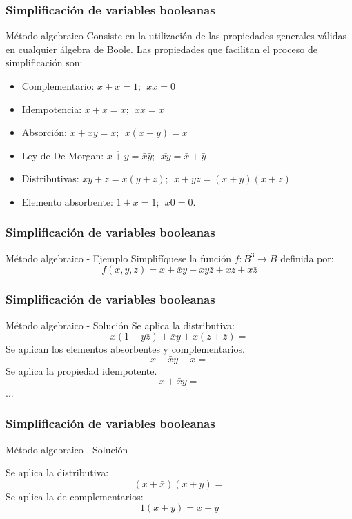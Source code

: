 \documentclass{beamer}
\begin{document}
\begin{frame}
\frametitle{Simplificaci\'on de variables booleanas}
\begin{block}{M\'etodo algebraico}
Consiste en la utilizaci\'on de las propiedades generales v\'alidas en cualquier \'algebra de Boole. Las propiedades que facilitan el proceso de simplificaci\'on son:
\begin{itemize}
\item Complementario: $x+\bar x = 1;\ \  x\bar x = 0$
\item Idempotencia: $x+ x = x;\ \  x x = x$
\item Absorci\'on: $x+ xy = x;\ \  x( x+y) = x$
\item Ley de De Morgan: $\overline{x+y}  = \bar x\bar y ;\ \  \overline{xy} = \bar x + \bar y$
\item Distributivas: $xy+z = x(y+z);\ \ x+yz = (x+y)(x+z)$
\item Elemento absorbente: $1+x = 1;\ \ x0 = 0$.
\end{itemize}
\end{block}
\end{frame}




\begin{frame}
\frametitle{Simplificaci\'on de variables booleanas}
\begin{block}{M\'etodo algebraico - Ejemplo}
Simplif\'iquese la funci\'on $f:B^3\longrightarrow B$ definida por: 
\[f(x,y,z) = x+\bar xy + xy\bar z +xz + x\bar z\]
\end{block}
\end{frame}



\begin{frame}
\frametitle{Simplificaci\'on de variables booleanas}
\begin{block}{M\'etodo algebraico - Soluci\'on}
Se aplica la distributiva:
\[ x(1+y\bar z) + \bar x y + x (z+\bar z) = \]
Se aplican los elementos absorbentes y complementarios.
\[x+\bar x y +x = \]
Se aplica la propiedad idempotente.
\[x+\bar x y = \]
...
\end{block}
\end{frame}



\begin{frame}
\frametitle{Simplificaci\'on de variables booleanas}
\begin{block}{M\'etodo algebraico . Soluci\'on}

Se aplica la distributiva:
\[(x+\bar x)(x+y) = \]
Se aplica la de complementarios:
\[1(x+y) = x+y \]

\end{block}
\end{frame}
\end{document}
